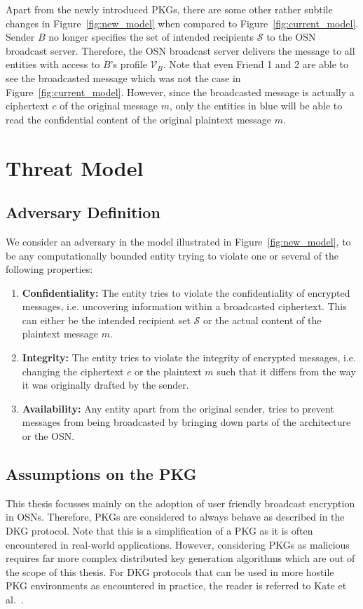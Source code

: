 Apart from the newly introduced PKGs, there are some other rather subtile changes in Figure~\ref{fig:new_model} when compared to Figure~\ref{fig:current_model}. Sender $B$ no longer specifies the set of intended recipients $\mathcal{S}$ to the OSN broadcast server. Therefore, the OSN broadcast server delivers the message to all entities with access to $B$'s profile $\mathcal{V}_B$. Note that even Friend 1 and 2 are able to see the broadcasted message which was not the case in Figure~\ref{fig:current_model}. However, since the broadcasted message is actually a ciphertext $c$ of the original message $m$, only the entities in blue will be able to read the confidential content of the original plaintext message $m$.

\section{Threat Model}

\subsection{Adversary Definition}
We consider an adversary in the model illustrated in Figure~\ref{fig:new_model}, to be any computationally bounded entity trying to violate one or several of the following properties:
\begin{enumerate}
 \item \textbf{Confidentiality:} The entity tries to violate the confidentiality of encrypted messages, i.e. uncovering information within a broadcasted ciphertext. This can either be the intended recipient set $\mathcal{S}$ or the actual content of the plaintext message $m$.
 \item \textbf{Integrity:} The entity tries to violate the integrity of encrypted messages, i.e. changing the ciphertext $c$ or the plaintext $m$ such that it differs from the way it was originally drafted by the sender.
 \item \textbf{Availability:} Any entity apart from the original sender, tries to prevent messages from being broadcasted by bringing down parts of the architecture or the OSN. 
\end{enumerate}

\subsection{Assumptions on the PKG}
\label{sec:assymptions_on_pkg}
This thesis focusses mainly on the adoption of user friendly broadcast encryption in OSNs. Therefore, PKGs are considered to always behave as described in the DKG protocol. Note that this is a simplification of a PKG as it is often encountered in real-world applications. However, considering PKGs as malicious requires far more complex distributed key generation algorithms which are out of the scope of this thesis. For DKG protocols that can be used in more hostile PKG environments as encountered in practice, the reader is referred to Kate et al.~\cite{art:KateHG12}.

